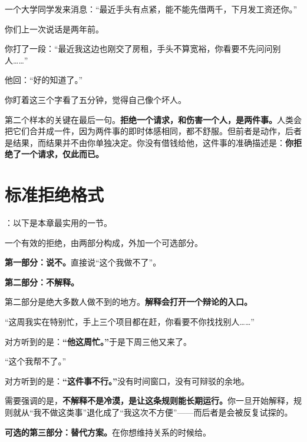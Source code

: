 \par
\begin{mdquote}
一个大学同学发来消息：“最近手头有点紧，能不能先借两千，下月发工资还你。”\par
你们上一次说话是两年前。\par
你打了一段：“最近我这边也刚交了房租，手头不算宽裕，你看要不先问问别人……”\par
他回：“好的知道了。”\par
你盯着这三个字看了五分钟，觉得自己像个坏人。
\end{mdquote}

第二个样本的关键在最后一句。\textbf{拒绝一个请求，和伤害一个人，是两件事。}人类会把它们合并成一件，因为两件事的即时体感相同，都不舒服。但前者是动作，后者是结果，而结果并不由你单独决定。你没有借钱给他，这件事的准确描述是：\textbf{你拒绝了一个请求，仅此而已。}

\section{标准拒绝格式}

：以下是本章最实用的一节。

一个有效的拒绝，由两部分构成，外加一个可选部分。

\textbf{第一部分：说不。}直接说“这个我做不了”。

\textbf{第二部分：不解释。}

第二部分是绝大多数人做不到的地方。\textbf{解释会打开一个辩论的入口。}

\begin{mdquote}
“这周我实在特别忙，手上三个项目都在赶，你看要不你找找别人……”\par
\vspace{0.3\baselineskip}
对方听到的是：\textbf{“他这周忙。”}于是下周三他又来了。
\end{mdquote}

\begin{mdquote}
“这个我帮不了。”\par
\vspace{0.3\baselineskip}
对方听到的是：\textbf{“这件事不行。”}没有时间窗口，没有可辩驳的余地。
\end{mdquote}

需要强调的是，\textbf{不解释不是冷漠，是让这条规则能长期运行。}你一旦开始解释，规则就从“我不做这类事”退化成了“我这次不方便”——而后者是会被反复试探的。

\textbf{可选的第三部分：替代方案。}在你想维持关系的时候给。

